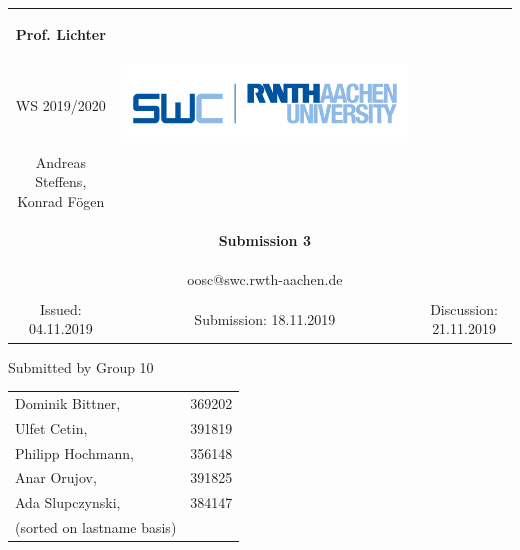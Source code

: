 \begin{tabular}{ccc}
		\begin{large} \textbf{Prof. Lichter} \end{large} &
		
		\begin{minipage}[H]{3.5cm}
			\centering
			\begin{large} OOSC \end{large} \\
			\begin{large} WS 2019/2020 \end{large}
		\end{minipage} &
		
		\begin{minipage}[H]{4cm}
			\includegraphics[keepaspectratio,width=\textwidth,angle=0]{images/swc.png}
		\end{minipage} \\
		Andreas Steffens, Konrad F\"ogen &  &  \\
		& \begin{huge} \textbf{Submission 3} \end{huge}&  \\
		& oosc@swc.rwth-aachen.de &  \\
		& & \\
		Issued: 04.11.2019 &
		Submission: 18.11.2019 &
		Discussion: 21.11.2019 \\
	\end{tabular}
	\newline \newline \newline
	\begin{center}
		Submitted by Group 10
		
		\begin{tabular}{ll}
			Dominik Bittner, & 369202 \\
			Ulfet Cetin, & 391819\\
			Philipp Hochmann, & 356148 \\
			Anar Orujov, & 391825\\
			Ada Slupczynski, & 384147\\
			(sorted on lastname basis)
		\end{tabular}
	\end{center}